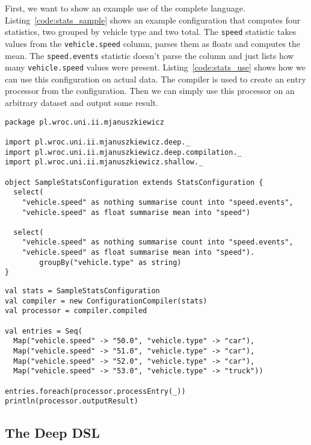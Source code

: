 First, we want to show an example use of the complete language.
Listing~\ref{code:stats_sample} shows an example configuration that computes four statistics, two grouped by vehicle type and two total.
The \texttt{speed} statistic takes values from the \texttt{vehicle.speed} column, parses them as floats and computes the mean.
The \texttt{speed.events} statistic doesn't parse the column and just lists how many \texttt{vehicle.speed} values were present.
Listing~\ref{code:stats_use} shows how we can use this configuration on actual data.
The compiler is used to create an entry processor from the configuration.
Then we can simply use this processor on an arbitrary dataset and output some result.

\begin{lstlisting}[caption=Defined statistics, label=code:stats_sample]
package pl.wroc.uni.ii.mjanuszkiewicz

import pl.wroc.uni.ii.mjanuszkiewicz.deep._
import pl.wroc.uni.ii.mjanuszkiewicz.deep.compilation._
import pl.wroc.uni.ii.mjanuszkiewicz.shallow._

object SampleStatsConfiguration extends StatsConfiguration {
  select(
    "vehicle.speed" as nothing summarise count into "speed.events",
    "vehicle.speed" as float summarise mean into "speed")

  select(
    "vehicle.speed" as nothing summarise count into "speed.events",
    "vehicle.speed" as float summarise mean into "speed").
		groupBy("vehicle.type" as string)
}
\end{lstlisting}

\begin{lstlisting}[caption=Using statistics, label=code:stats_use]
val stats = SampleStatsConfiguration
val compiler = new ConfigurationCompiler(stats)
val processor = compiler.compiled

val entries = Seq(
  Map("vehicle.speed" -> "50.0", "vehicle.type" -> "car"),
  Map("vehicle.speed" -> "51.0", "vehicle.type" -> "car"),
  Map("vehicle.speed" -> "52.0", "vehicle.type" -> "car"),
  Map("vehicle.speed" -> "53.0", "vehicle.type" -> "truck"))

entries.foreach(processor.processEntry(_))
println(processor.outputResult)
\end{lstlisting}

\subsection{The Deep DSL}

